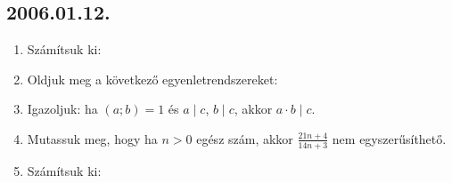 \subsection*{2006.01.12.}
\begin{enumerate}
\item Számítsuk ki:

\item Oldjuk meg a következő egyenletrendszereket:

\item Igazoljuk: ha $(a;b)=1$ és $a \mid c$, $b \mid c$, akkor $a \cdot b \mid c$.

\item Mutassuk meg, hogy ha $n>0$ egész szám, akkor $\frac{21n+4}{14n+3}$ nem egyszerűsíthető.

\item Számítsuk ki:
\end{enumerate}

